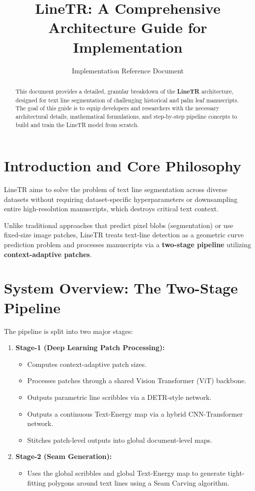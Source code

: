 \documentclass[12pt,a4paper]{article}
\title{\textbf{LineTR: A Comprehensive Architecture Guide for Implementation}}
\author{Implementation Reference Document}
\date{}
\begin{document}
\maketitle

\begin{abstract}
This document provides a detailed, granular breakdown of the \textbf{LineTR} architecture, designed for text line segmentation of challenging historical and palm leaf manuscripts. The goal of this guide is to equip developers and researchers with the necessary architectural details, mathematical formulations, and step-by-step pipeline concepts to build and train the LineTR model from scratch.
\end{abstract}

\tableofcontents
\newpage

\section{Introduction and Core Philosophy}
LineTR aims to solve the problem of text line segmentation across diverse datasets without requiring dataset-specific hyperparameters or downsampling entire high-resolution manuscripts, which destroys critical text context. 

Unlike traditional approaches that predict pixel blobs (segmentation) or use fixed-size image patches, LineTR treats text-line detection as a geometric curve prediction problem and processes manuscripts via a \textbf{two-stage pipeline} utilizing \textbf{context-adaptive patches}.

\section{System Overview: The Two-Stage Pipeline}

The pipeline is split into two major stages:
\begin{enumerate}
    \item \textbf{Stage-1 (Deep Learning Patch Processing):} 
    \begin{itemize}
        \item Computes context-adaptive patch sizes.
        \item Processes patches through a shared Vision Transformer (ViT) backbone.
        \item Outputs parametric line scribbles via a DETR-style network.
        \item Outputs a continuous Text-Energy map via a hybrid CNN-Transformer network.
        \item Stitches patch-level outputs into global document-level maps.
    \end{itemize}
    \item \textbf{Stage-2 (Seam Generation):}
    \begin{itemize}
        \item Uses the global scribbles and global Text-Energy map to generate tight-fitting polygons around text lines using a Seam Carving algorithm.
    \end{itemize}
\end{enumerate}
\end{document}

